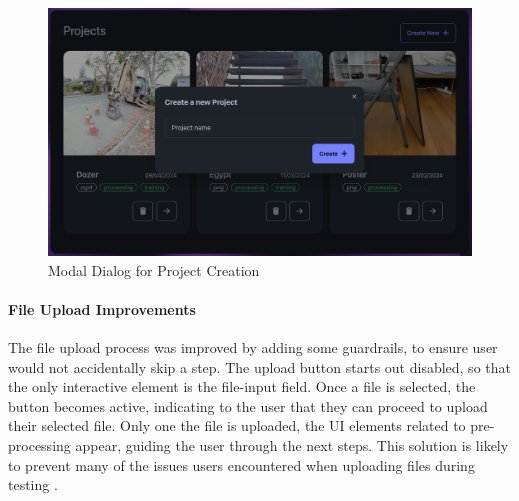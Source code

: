 \begin{figure}[htb]
  \centering
	\includegraphics[width=.7\textwidth]{figures/fix-3.png}
	\caption{Modal Dialog for Project Creation}
  \label{fig:fix-3}
\end{figure}

\paragraph{File Upload Improvements}
The file upload process was improved by adding some guardrails, to ensure user would not accidentally skip a step.
The upload button starts out disabled, so that the only interactive element is the file-input field.
Once a file is selected, the button becomes active, indicating to the user that they can proceed to upload their selected file.
Only one the file is uploaded, the UI elements related to pre-processing appear, guiding the user through the next steps.
This solution is likely to prevent many of the issues users encountered when uploading files during testing .


